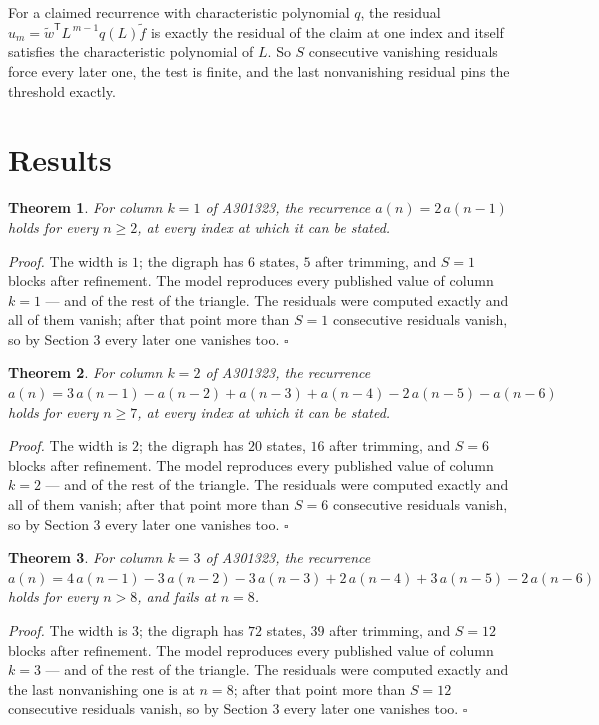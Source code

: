 \documentclass[11pt]{article}
\newtheorem{theorem}{Theorem}
\theoremstyle{definition}
\begin{document}
For a claimed recurrence with characteristic polynomial $q$, the residual $u_m = \tilde w^{\mathsf T}L^{\,m-1}q(L)\tilde f$ is exactly the residual of the claim at one index and itself satisfies the characteristic polynomial of $L$. So $S$ consecutive vanishing residuals force every later one, the test is finite, and the last nonvanishing residual pins the threshold exactly.

\section{Results}

\begin{theorem} For column $k = 1$ of A301323, the recurrence $a(n) = 2\,a(n-1)$ holds for every $n \ge 2$, at every index at which it can be stated.\end{theorem}

{\itshape Proof.} The width is $1$; the digraph has $6$ states, $5$ after trimming, and $S = 1$ blocks after refinement. The model reproduces every published value of column $k = 1$ --- and of the rest of the triangle. The residuals were computed exactly and all of them vanish; after that point more than $S = 1$ consecutive residuals vanish, so by Section 3 every later one vanishes too. $\square$

\begin{theorem} For column $k = 2$ of A301323, the recurrence $a(n) = 3\,a(n-1) - a(n-2) + a(n-3) + a(n-4) - 2\,a(n-5) - a(n-6)$ holds for every $n \ge 7$, at every index at which it can be stated.\end{theorem}

{\itshape Proof.} The width is $2$; the digraph has $20$ states, $16$ after trimming, and $S = 6$ blocks after refinement. The model reproduces every published value of column $k = 2$ --- and of the rest of the triangle. The residuals were computed exactly and all of them vanish; after that point more than $S = 6$ consecutive residuals vanish, so by Section 3 every later one vanishes too. $\square$

\begin{theorem} For column $k = 3$ of A301323, the recurrence $a(n) = 4\,a(n-1) - 3\,a(n-2) - 3\,a(n-3) + 2\,a(n-4) + 3\,a(n-5) - 2\,a(n-6)$ holds for every $n > 8$, and fails at $n = 8$.\end{theorem}

{\itshape Proof.} The width is $3$; the digraph has $72$ states, $39$ after trimming, and $S = 12$ blocks after refinement. The model reproduces every published value of column $k = 3$ --- and of the rest of the triangle. The residuals were computed exactly and the last nonvanishing one is at $n = 8$; after that point more than $S = 12$ consecutive residuals vanish, so by Section 3 every later one vanishes too. $\square$
\end{document}

